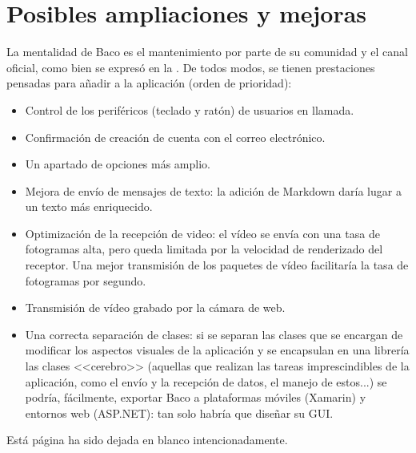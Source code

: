 \documentclass[12pt, a4paper]{book} %
\makeatletter
\newcommand*{\blankpage}{%
	\vspace*{\fill}
	{\centering Está página ha sido dejada en blanco intencionadamente.\par}
	\vspace{\fill}}
\renewcommand*{\cleardoublepage}{\clearpage\if@twoside \ifodd\c@page\else
	\blankpage
	\thispagestyle{fancy}
	\newpage
	\if@twocolumn\hbox{}\newpage\fi\fi\fi}
\makeatother
\begin{document}
		\section{Posibles ampliaciones y mejoras}
		La mentalidad de Baco es el mantenimiento por parte de su comunidad y el canal oficial, como bien se expresó en la . De todos modos, se tienen prestaciones pensadas para añadir a la aplicación (orden de prioridad):
		\begin{itemize}
			\item Control de los periféricos (teclado y ratón) de usuarios en llamada.
			\item Confirmación de creación de cuenta con el correo electrónico.
			\item Un apartado de opciones más amplio.
			\item Mejora de envío de mensajes de texto: la adición de Markdown daría lugar a un texto más enriquecido.
			\item Optimización de la recepción de video: el vídeo se envía con una tasa de fotogramas alta, pero queda limitada por la velocidad de renderizado del receptor. Una mejor transmisión de los paquetes de vídeo facilitaría la tasa de fotogramas por segundo.
			\item Transmisión de vídeo grabado por la cámara de web.
			\item Una correcta separación de clases: si se separan las clases que se encargan de modificar los aspectos visuales de la aplicación y se encapsulan en una librería las clases <<cerebro>> (aquellas que realizan las tareas imprescindibles de la aplicación, como el envío y la recepción de datos, el manejo de estos...) se podría, fácilmente, exportar Baco a plataformas móviles (Xamarin) y entornos web (ASP.NET): tan solo habría que diseñar su GUI.
		\end{itemize}
		
	\backmatter
	
	\lstlistoflistings {}
	
	
	
	
	\cleardoublepage \clearpage \pagestyle{empty} \vspace*{\fill}
	
\end{document}
